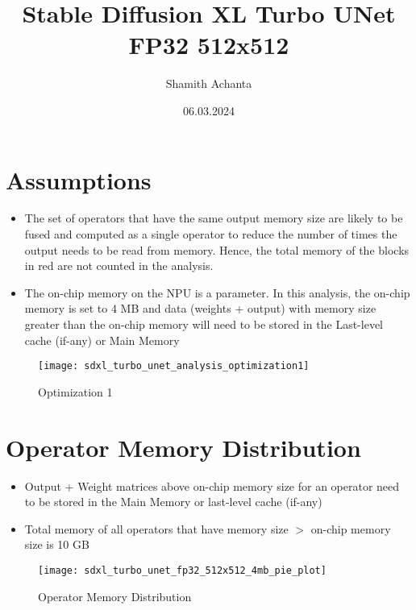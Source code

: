 \documentclass[12pt, letter, landscape]{article}
\begin{document}
\title{Stable Diffusion XL Turbo UNet FP32 512x512}
\author{Shamith Achanta}
\date{06.03.2024}

\maketitle

\section{Assumptions}
\begin{itemize}
	\item The set of operators that have the same output memory size are likely to be fused and computed as a single operator to reduce the number of times the output needs to be read from memory. Hence, the total memory of the blocks in red are not counted in the analysis.
	\item The on-chip memory on the NPU is a parameter. In this analysis, the on-chip memory is set to 4 MB and data (weights + output) with memory size greater than the on-chip memory will need to be stored in the Last-level cache (if-any) or Main Memory
\end{itemize}

\begin{figure}[h]
\caption{Optimization 1}
\centering
\texttt{[image: sdxl\_turbo\_unet\_analysis\_optimization1]}
\end{figure}

\clearpage

\section{Operator Memory Distribution}
\begin{itemize}
	\item Output + Weight matrices above on-chip memory size for an operator need to be stored in the Main Memory or last-level cache (if-any)
	\item Total memory of all operators that have memory size $>$ on-chip memory size is 10 GB
\end{itemize}

\begin{figure}[h]
\caption{Operator Memory Distribution}
\centering
\texttt{[image: sdxl\_turbo\_unet\_fp32\_512x512\_4mb\_pie\_plot]}
\end{figure}

\clearpage
\end{document}
